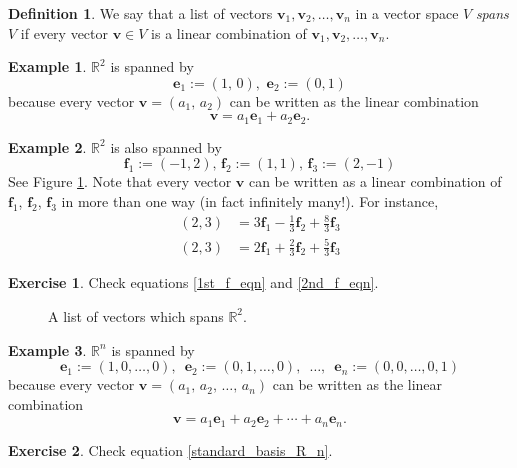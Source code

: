 \documentclass[a4paper,11pt]{book}
\theoremstyle{definition}
\newtheorem{definition}[theorem]{Definition}
\newtheorem{exercise}{Exercise}
\newtheorem{example_environment}{Example}[chapter]
\newcommand{\be}{\begin{equation}}
\newcommand{\ee}{\end{equation}}
\newcommand{\ve}[1]{\mathbf{#1}}
\newenvironment{example}
	{
		\begin{oframed} 
		\begin{example_environment}
	}
	{
		\end{example_environment}
		\end{oframed}
	}
\begin{document}
\begin{definition} We say that a list of vectors $\ve{v}_1, \ve{v}_2, \ldots, \ve{v}_n$ in a vector space $V$ {\em spans} $V$ if every vector $\ve{v} \in V$ is a linear combination of $\ve{v}_1, \ve{v}_2, \ldots, \ve{v}_n$. 
\end{definition}

\begin{example} $\mathbb{R}^2$ is spanned by
\[
 \ve{e}_1 := (1, \, 0), \, \, \ve{e}_2 := (0, 1)
\]
because every vector $\ve{v} = (a_1, \, a_2)$ can be written as the linear combination
\[
 \ve{v} = a_1 \ve{e}_1 + a_2 \ve{e}_2.
\]
\end{example}
\begin{example} $\mathbb{R}^2$ is also spanned by \label{three_vectors_spanning_R2_example}
\[
 \ve{f}_1 := (-1, 2), \, \ve{f}_2 := (1, 1), \, \ve{f}_3 := (2, -1)
\]
See Figure \ref{spanning_set_R2}. Note that every vector $\ve{v}$ can be written as a linear combination of $\ve{f}_1$, $\ve{f}_2$, $\ve{f}_3$ in more than one way (in fact infinitely many!). For instance,
\begin{align}
 (2, 3) &= 3 \ve{f}_1  - \frac{1}{3} \ve{f}_2 + \frac{8}{3} \ve{f}_3 \label{1st_f_eqn} \\
 (2,3) &= 2 \ve{f}_1 + \frac{2}{3} \ve{f}_2 + \frac{5}{3} \ve{f}_3 \label{2nd_f_eqn}
\end{align}

\begin{exercise} Check equations \eqref{1st_f_eqn} and \eqref{2nd_f_eqn}.
\end{exercise}
\end{example}

\begin{figure}[t] 
	\centering
	\caption{\label{spanning_set_R2} A list of vectors which spans $\mathbb{R}^2$.}
\end{figure}

\begin{example} $\mathbb{R}^n$ is spanned by  \label{Rn_spanning_set}
\be \label{defn_of_e_i}
\ve{e}_1 := (1, 0, \ldots, 0), \,\,\, \ve{e}_2 := (0, 1, \ldots, 0), \,\,\, \ldots, \,\,\, \ve{e}_n := (0, 0, \ldots, 0, 1)
\ee
because every vector $\ve{v} = (a_1, \,a_2, \, \ldots, \, a_n)$ can be written as the linear combination
\be \label{standard_basis_R_n}
 \ve{v} = a_1 \ve{e}_1 + a_2 \ve{e}_2 + \cdots + a_n \ve{e}_n.
\ee
\begin{exercise} Check equation \eqref{standard_basis_R_n}.
\end{exercise}
\end{example}
\end{document}
